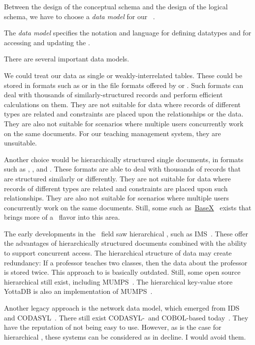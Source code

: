 %
\label{sec:dbModelSelection}%
%
Between the design of the conceptual schema and the design of the logical schema, we have to choose a \emph{data model} for our \db~\cite{SS2005EIDDDFDB:I}.%
%
\begin{definition}%
The \emph{data model} specifies the notation and language for defining datatypes and for accessing and updating the \db.%
\end{definition}%
%
There are several important data models.

We could treat our data as single or weakly-interrelated tables.
These could be stored in formats such as  or in the file formats offered by  or .
Such formats can deal with thousands of similarly-structured records and perform efficient calculations on them.
They are not suitable for data where records of different types are related and constraints are placed upon the relationships or the data.
They are also not suitable for scenarios where multiple users concurrently work on the same documents.
For our teaching management system, they are unsuitable.

Another choice would be hierarchically structured single documents, in formats such as , , and .
These formats are able to deal with thousands of records that are structured similarly or differently.
They are not suitable for data where records of different types are related and constraints are placed upon such relationships.
They are also not suitable for scenarios where multiple users concurrently work on the same documents.
Still, some  such as~\href{https://basex.org}{BaseX}~\cite{GHS2010B,G2006PXMMDTTL} exists that brings more of a \db\ flavor into this area.

The early developments in the \db\ field saw hierarchical , such as IMS~\cite{KLBGNLWBS2012ITIYCGTIIMS,BBP2007TBOI,KC2024DS:ITD}.
These offer the advantages of hierarchically structured documents combined with the ability to support concurrent access.
The hierarchical structure of data may create redundancy:
If a professor teaches two classes, then the data about the professor is stored twice.
This approach to  is basically outdated.
Still, some open source hierarchical  still exist, including MUMPS~\cite{O2008TMPL,O2025TMPL}.
The hierarchical key-value store YottaDB is also an implementation of MUMPS~\cite{B2018THALOMMATFOY}.

Another legacy approach is the network data model, which emerged from IDS~\cite{B2009TOOTIDSITFDAD,B1965SFRAP,H2016HCBITDAFOODW} and CODASYL~\cite{TF1976CDBMS}.
There still exist CODASYL-\ and COBOL-based  today~\cite{O2022OCDDARM}.
They have the reputation of not being easy to use.
However, as is the case for hierarchical , these systems can be considered as in decline.
I would avoid them.

